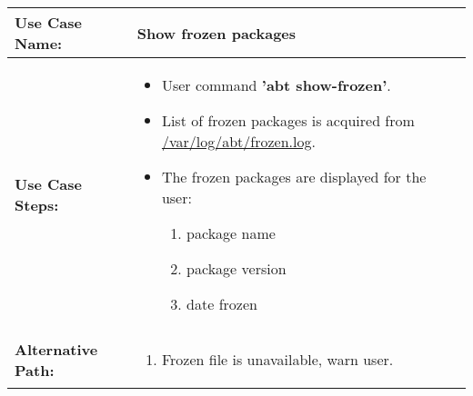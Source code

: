 \medskip

\begin{tabularx}{\linewidth}{|l|X|}
\hline
\textbf{Use Case Name:} & \textbf{Show frozen packages} \\
\hline
\textbf{Use Case Steps:} & 
\begin{minipage}{\linewidth} 
  \vspace{0.05em}
  \begin{itemize}
    \item User command \textbf{'abt show-frozen'}.
    \item List of frozen packages is acquired from \url{/var/log/abt/frozen.log}.
    \item The frozen packages are displayed for the user:
    \begin{enumerate}
      \item package name
      \item package version
      \item date frozen
    \end{enumerate}
  \end{itemize}
  \vspace{0.05em}
\end{minipage}
\\
\hline 
\textbf{Alternative Path:} &
\begin{minipage}{\linewidth}
  \vspace{0.05em} 
  \begin{enumerate}
    \item Frozen file is unavailable, warn user.
  \end{enumerate}
  \vspace{0.05em} 
\end{minipage}
\\
\hline
\end{tabularx}